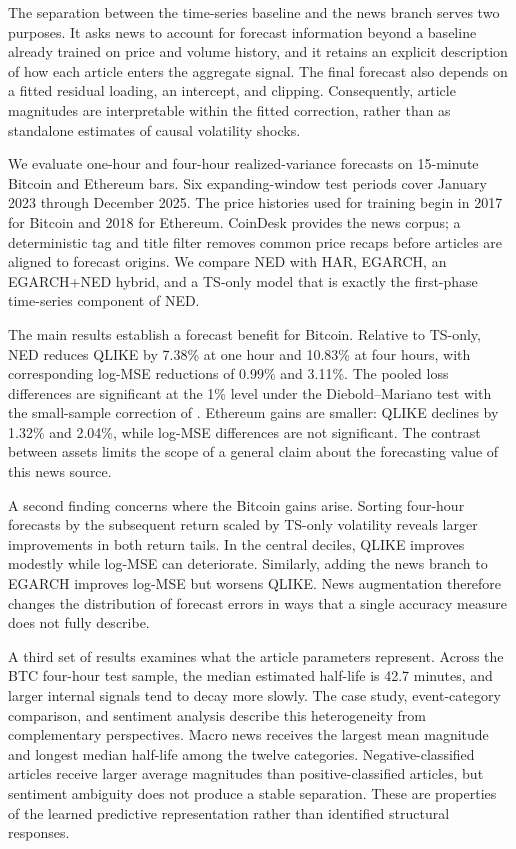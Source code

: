 The separation between the time-series baseline and the news branch
serves two purposes. It asks news to account for forecast information
beyond a baseline already trained on price and volume history, and it
retains an explicit description of how each article enters the
aggregate signal. The final forecast also depends on a fitted residual
loading, an intercept, and clipping. Consequently, article magnitudes
are interpretable within the fitted correction, rather than as
standalone estimates of causal volatility shocks.

We evaluate one-hour and four-hour realized-variance forecasts on
15-minute Bitcoin and Ethereum bars. Six expanding-window test periods
cover January 2023 through December 2025. The price histories used for
training begin in 2017 for Bitcoin and 2018 for Ethereum. CoinDesk
provides the news corpus; a deterministic tag and title filter removes
common price recaps before articles are aligned to forecast origins.
We compare NED with HAR, EGARCH, an EGARCH+NED hybrid, and a TS-only
model that is exactly the first-phase time-series component of NED.

The main results establish a forecast benefit for Bitcoin. Relative
to TS-only, NED reduces QLIKE by 7.38\% at one hour and 10.83\% at
four hours, with corresponding log-MSE reductions of 0.99\% and
3.11\%. The pooled loss differences are significant at the 1\%
level under the Diebold--Mariano test with the small-sample correction
of \citet{Harvey_1997}. Ethereum gains are smaller: QLIKE declines
by 1.32\% and 2.04\%, while log-MSE differences are not significant.
The contrast between assets limits the scope of a general claim
about the forecasting value of this news source.

A second finding concerns where the Bitcoin gains arise. Sorting
four-hour forecasts by the subsequent return scaled by TS-only
volatility reveals larger improvements in both return tails. In
the central deciles, QLIKE improves modestly while log-MSE can
deteriorate. Similarly, adding the news branch to EGARCH improves
log-MSE but worsens QLIKE. News augmentation therefore changes the
distribution of forecast errors in ways that a single accuracy
measure does not fully describe.

A third set of results examines what the article parameters represent.
Across the BTC four-hour test sample, the median estimated half-life
is 42.7 minutes, and larger internal signals tend to decay more
slowly. The case study, event-category comparison, and sentiment
analysis describe this heterogeneity from complementary perspectives.
Macro news receives the largest mean magnitude and longest median
half-life among the twelve categories.
Negative-classified articles receive larger average magnitudes than
positive-classified articles, but sentiment ambiguity does not produce
a stable separation. These are properties of the learned predictive
representation rather than identified structural responses.

